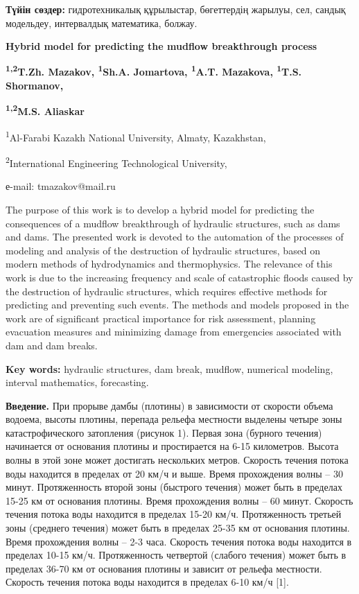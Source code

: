 \textbf{Түйін сөздер:} гидротехникалық құрылыстар, бөгеттердің жарылуы,
сел, сандық модельдеу, интервалдық математика, болжау.

\textbf{Hybrid model for predicting the mudflow breakthrough process}

\textbf{\textsuperscript{1,2}T.Zh. Mazakov, \textsuperscript{1}Sh.A.
Jomartova, \textsuperscript{1}A.T. Mazakova, \textsuperscript{1}T.S.
Shormanov,}

\textbf{\textsuperscript{1,2}M.S. Aliaskar}

\textsuperscript{1}Al-Farabi Kazakh National University, Almaty,
Kazakhstan,

\textsuperscript{2}International Engineering Technological University,

е-mail: tmazakov@mail.ru

The purpose of this work is to develop a hybrid model for predicting the
consequences of a mudflow breakthrough of hydraulic structures, such as
dams and dams. The presented work is devoted to the automation of the
processes of modeling and analysis of the destruction of hydraulic
structures, based on modern methods of hydrodynamics and thermophysics.
The relevance of this work is due to the increasing frequency and scale
of catastrophic floods caused by the destruction of hydraulic
structures, which requires effective methods for predicting and
preventing such events. The methods and models proposed in the work are
of significant practical importance for risk assessment, planning
evacuation measures and minimizing damage from emergencies associated
with dam and dam breaks.

\textbf{Key words:} hydraulic structures, dam break, mudflow, numerical
modeling, interval mathematics, forecasting.

\textbf{Введение.} При прорыве дамбы (плотины) в зависимости от скорости
объема водоема, высоты плотины, перепада рельефа местности выделены
четыре зоны катастрофического затопления (рисунок 1). Первая зона
(бурного течения) начинается от основания плотины и простирается на 6-15
километров. Высота волны в этой зоне может достигать нескольких метров.
Скорость течения потока воды находится в пределах от 20 км/ч и выше.
Время прохождения волны -- 30 минут. Протяженность второй зоны (быстрого
течения) может быть в пределах 15-25 км от основания плотины. Время
прохождения волны -- 60 минут. Скорость течения потока воды находится в
пределах 15-20 км/ч. Протяженность третьей зоны (среднего течения) может
быть в пределах 25-35 км от основания плотины. Время прохождения волны
-- 2-3 часа. Скорость течения потока воды находится в пределах 10-15
км/ч. Протяженность четвертой (слабого течения) может быть в пределах
36-70 км от основания плотины и зависит от рельефа местности. Скорость
течения потока воды находится в пределах 6-10 км/ч {[}1{]}.


